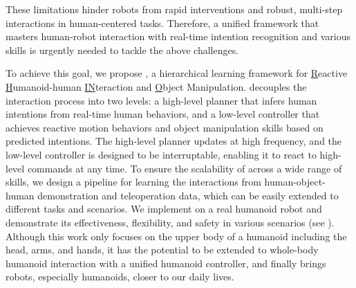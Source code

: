 These limitations hinder robots from rapid interventions and robust, multi-step interactions in human-centered tasks. Therefore, a unified framework that masters human-robot interaction with real-time intention recognition and various skills is urgently needed to tackle the above challenges.


To achieve this goal, we propose \our, a hierarchical learning framework for \underline{R}eactive \underline{H}umanoid-human \underline{IN}teraction and \underline{O}bject Manipulation.
\our decouples the interaction process into two levels: a high-level planner that infers human intentions from real-time human behaviors, and a low-level controller that achieves reactive motion behaviors and object manipulation skills based on predicted intentions. The high-level planner updates at high frequency, and the low-level controller is designed to be interruptable, enabling it to react to high-level commands at any time.
To ensure the scalability of \our across a wide range of skills, we design a pipeline for learning the interactions from human-object-human demonstration and teleoperation data, which can be easily extended to different tasks and scenarios.
We implement \our on a real humanoid robot and demonstrate its effectiveness, flexibility, and safety in various scenarios (see ). 
Although this work only focuses on the upper body of a humanoid including the head, arms, and hands, it has the potential to be extended to whole-body humanoid interaction with a unified humanoid controller, and finally brings robots, especially humanoids, closer to our daily lives.

